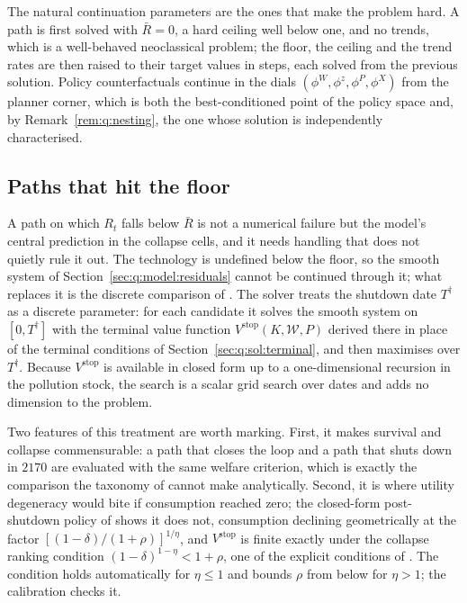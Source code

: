  The natural continuation parameters are the ones that make the problem hard. A path is first solved with $\bar R=0$, a hard ceiling well below one, and no trends, which is a well-behaved neoclassical problem; the floor, the ceiling and the trend rates are then raised to their target values in steps, each solved from the previous solution. Policy counterfactuals continue in the dials $\left(\phi^W,\phi^z,\phi^P,\phi^X\right)$ from the planner corner, which is both the best-conditioned point of the policy space and, by Remark~\ref{rem:q:nesting}, the one whose solution is independently characterised.

\subsection{Paths that hit the floor}\label{sec:q:sol:collapse}

A path on which $R_t$ falls below $\bar R$ is not a numerical failure but the model's central prediction in the collapse cells, and it needs handling that does not quietly rule it out. The technology is undefined below the floor, so the smooth system of Section~\ref{sec:q:model:residuals} cannot be continued through it; what replaces it is the discrete comparison of . The solver treats the shutdown date $T^{\dagger}$ as a discrete parameter: for each candidate it solves the smooth system on $\left[0,T^{\dagger}\right]$ with the terminal value function $V^{\mathrm{stop}}\left(K,\mathcal W,P\right)$ derived there in place of the terminal conditions of Section~\ref{sec:q:sol:terminal}, and then maximises over $T^{\dagger}$. Because $V^{\mathrm{stop}}$ is available in closed form up to a one-dimensional recursion in the pollution stock, the search is a scalar grid search over dates and adds no dimension to the problem.

Two features of this treatment are worth marking. First, it makes survival and collapse commensurable: a path that closes the loop and a path that shuts down in $2170$ are evaluated with the same welfare criterion, which is exactly the comparison the taxonomy of  cannot make analytically. Second, it is where utility degeneracy would bite if consumption reached zero; the closed-form post-shutdown policy of  shows it does not, consumption declining geometrically at the factor $\left[\left(1-\delta\right)/\left(1+\rho\right)\right]^{1/\eta}$, and $V^{\mathrm{stop}}$ is finite exactly under the collapse ranking condition $\left(1-\delta\right)^{1-\eta}<1+\rho$, one of the explicit conditions of . The condition holds automatically for $\eta\le1$ and bounds $\rho$ from below for $\eta>1$; the calibration checks it.

